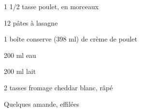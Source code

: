 %
%   
%   
%   
%




\totaltime{}


\begin{ingredients}
    \item 1 1/2 tasse poulet, en morceaux
    \item 12 pâtes à lasagne
    \item 1 boîte conserve (398 ml) de crème de poulet
    \item 200 ml eau
    \item 200 ml lait
    \item 2 tasses fromage cheddar blanc, râpé
    \item Quelques amande, effilées
\end{ingredients}


